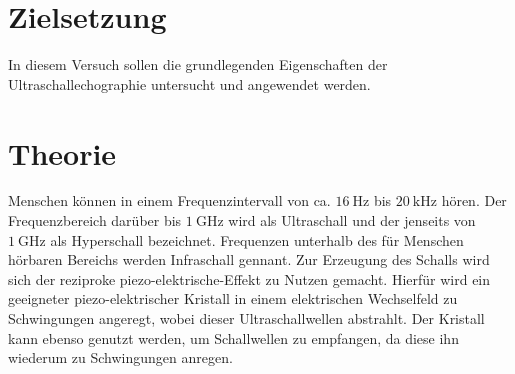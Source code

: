 \section{Zielsetzung}
\label{sec:Zielsetzung}

In diesem Versuch sollen die grundlegenden Eigenschaften der Ultraschallechographie untersucht und angewendet werden.

\section{Theorie}
\label{sec:Theorie}
Menschen können in einem Frequenzintervall von ca. $\SI{16}{\hertz}$ bis $\SI{20}{\kilo\hertz}$ hören. Der Frequenzbereich darüber bis $\SI{1}{\giga\hertz}$ wird als
Ultraschall und der jenseits von $\SI{1}{\giga\hertz}$ als Hyperschall bezeichnet. Frequenzen unterhalb des für Menschen hörbaren Bereichs werden Infraschall gennant.
\newline
Zur Erzeugung des Schalls wird sich der reziproke piezo-elektrische-Effekt zu Nutzen gemacht. Hierfür wird ein geeigneter piezo-elektrischer Kristall in einem
elektrischen Wechselfeld zu Schwingungen angeregt, wobei dieser Ultraschallwellen abstrahlt. Der Kristall kann ebenso genutzt werden, um Schallwellen zu empfangen,
da diese ihn wiederum zu Schwingungen anregen.

